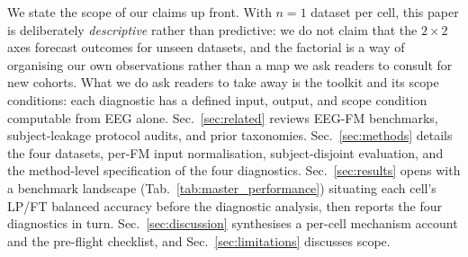 We state the scope of our claims up front. With $n=1$ dataset per
cell, this paper is deliberately \emph{descriptive} rather than
predictive: we do not claim that the $2\times 2$ axes forecast
outcomes for unseen datasets, and the factorial is a way of
organising our own observations rather than a map we ask readers to
consult for new cohorts. What we do ask readers to take away is the
toolkit and its scope conditions: each diagnostic has a defined
input, output, and scope condition computable from EEG alone.
Sec.~\ref{sec:related} reviews EEG-FM benchmarks, subject-leakage
protocol audits, and prior taxonomies. Sec.~\ref{sec:methods}
details the four datasets, per-FM input normalisation,
subject-disjoint evaluation, and the method-level specification of
the four diagnostics. Sec.~\ref{sec:results} opens with a benchmark
landscape (Tab.~\ref{tab:master_performance}) situating each cell's
LP/FT balanced accuracy before the diagnostic analysis, then reports
the four diagnostics in turn. Sec.~\ref{sec:discussion} synthesises a
per-cell mechanism account and the pre-flight checklist, and
Sec.~\ref{sec:limitations} discusses scope.
